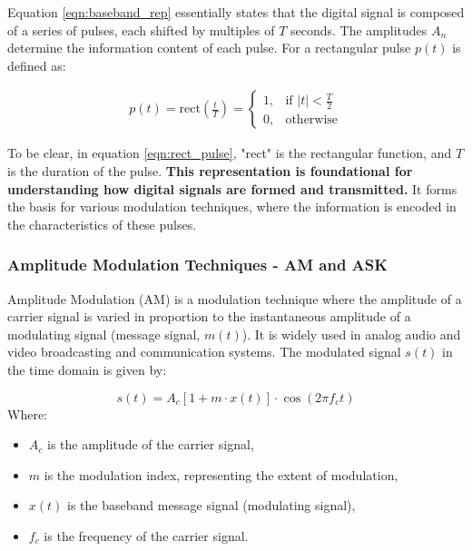 \documentclass[../../../../DMCC-My-Notebook]{subfiles}
\begin{document}
	    	Equation \ref{eqn:baseband_rep} essentially states that the digital signal is composed of a series of pulses, each shifted by multiples of $T$ seconds. The amplitudes $A_n$​ determine the information content of each pulse. For a rectangular pulse $p(t)$ is defined as:
	    	
	    	\begin{gather*}
	    		p(t) = \text{rect}\left(\frac{t}{T}\right) =
	    		\begin{cases} 
	    			1, & \text{if } |t| < \frac{T}{2} \\
	    			0, & \text{otherwise}
	    		\end{cases}
	    	\end{gather*}\label{eqn:rect_pulse}
	    	
	    	To be clear, in equation \ref{eqn:rect_pulse}, "rect" is the rectangular function, and $T$ is the duration of the pulse. \linebreak
	    	\textbf{This representation is foundational for understanding how digital signals are formed and transmitted.} It forms the basis for various modulation techniques, where the information is encoded in the characteristics of these pulses.
			
			
			
			
		\subsubsection{Amplitude Modulation Techniques - AM and ASK}
			Amplitude Modulation (AM) is a modulation technique where the amplitude of a carrier signal is varied in proportion to the instantaneous amplitude of a modulating signal (message signal, $m(t)$). It is widely used in analog audio and video broadcasting and communication systems.
			The modulated signal $s(t)$ in the time domain is given by:
			
			\begin{equation}
				s(t) = A_c [1 + m \cdot x(t)] \cdot \cos(2\pi f_c t)
			\end{equation}\label{eqn:amplitude_mod_simp}
			Where:
			\begin{itemize}[leftmargin=1cm]
				\item $A_c$ is the amplitude of the carrier signal,
				\item $m$ is the modulation index, representing the extent of modulation,
				\item $x(t)$ is the baseband message signal (modulating signal),
				\item $f_c$ is the frequency of the carrier signal.
			\end{itemize}
			
\end{document}

